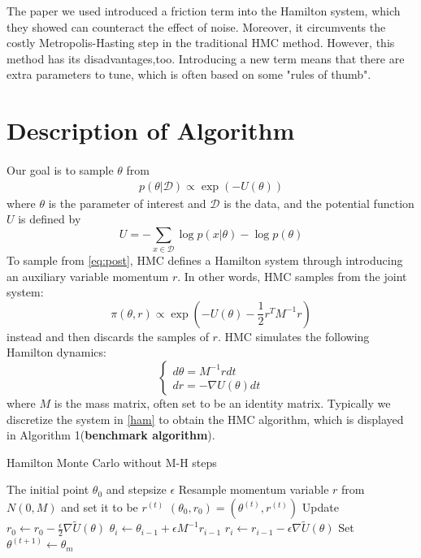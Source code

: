\documentclass[11pt]{article}
\begin{document}
The paper we used introduced a friction term into the Hamilton system, which they showed can counteract the effect of noise. Moreover, it circumvents the costly Metropolis-Hasting step in the traditional HMC method. However, this method has its disadvantages,too. Introducing a new term means that there are extra parameters to tune, which is often based on some "rules of thumb". 


\section{Description of Algorithm}
\paragraph{}
Our goal is to sample $\theta$ from 
\begin{align}
    p(\theta | \mathcal{D}) \propto \exp (-U(\theta)) \label{eq:post}
\end{align}
where $\theta$ is the parameter of interest and $\mathcal{D}$ is the data,  and the potential function $U$ is defined by
$$U=-\sum_{x \in \mathcal{D}} \log p(x | \theta)-\log p(\theta)
$$
To sample from \eqref{eq:post}, HMC defines a Hamilton system through introducing an auxiliary variable momentum $r$. In other words, HMC samples from the joint system:
\begin{equation}
    \pi(\theta, r) \propto \exp \left(-U(\theta)-\frac{1}{2} r^{T} M^{-1} r\right)
\end{equation}
instead and then discards the samples of $r$. HMC simulates the following Hamilton dynamics:
\begin{equation}
    \left\{\begin{array}{l}{d \theta=M^{-1} r d t} \\ {d r=-\nabla U(\theta) d t}\end{array}\right. \label{ham}
\end{equation}
where $M$ is the mass matrix, often set to be an identity matrix. Typically we discretize the system in \eqref{ham} to obtain the HMC algorithm, which is displayed in Algorithm 1(\textbf{benchmark algorithm}). 
\begin{algorithm}
	\caption{Hamilton Monte Carlo without M-H steps}
	\label{ALG:HMC}
	\begin{algorithmic} 
		\REQUIRE The initial point $\theta_0$ and stepsize $\epsilon$
        \STATE Resample momentum variable $r$ from $N(0,M)$ and set it to be $r^{(t)}$
        \STATE $\left(\theta_{0}, r_{0}\right)=\left(\theta^{(t)}, r^{(t)}\right)$
        \STATE Update $r_{0} \leftarrow r_{0}-\frac{\epsilon}{2} \nabla \tilde{U}(\theta)$
            \STATE $\theta_{i} \leftarrow \theta_{i-1}+\epsilon M^{-1} r_{i-1}$
            \STATE $r_{i}\leftarrow r_{i-1}-\epsilon \nabla \tilde{U}(\theta)$
        \ENDFOR
        \STATE Set $\theta^{(t+1)}\leftarrow\theta_m$ 
		\ENDFOR
	\end{algorithmic}
\end{algorithm}
\end{document}
